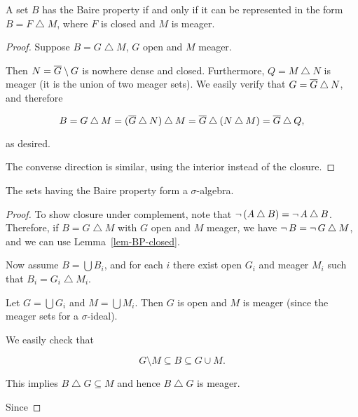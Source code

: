 \begin{lemma}\label{lem-bp-closed}A set $B$ has the Baire property if and only if it can be represented in the form $B = F \bigtriangleup M$,  where $F$ is closed and $M$ is meager.

\end{lemma}\begin{proof}Suppose $B = G \bigtriangleup M$, $G$ open and $M$ meager.

Then $N = \overline{G} \setminus G$ is nowhere dense and closed. Furthermore, $Q = M \bigtriangleup N$ is meager (it is the union of two meager sets). We easily verify that $G = \overline{G} \bigtriangleup N$, and therefore

\begin{equation}
B = G \bigtriangleup M = (\overline{G} \bigtriangleup N) \bigtriangleup M = \overline{G} \bigtriangleup (N \bigtriangleup M) = \overline{G} \bigtriangleup Q,
\end{equation}

as desired.

The converse direction is similar, using the interior instead of the closure.

\end{proof}\begin{proposition}\label{prop-bp-sigma-algebra}The sets having the Baire property form a $\sigma$-algebra.

\end{proposition}\begin{proof}To show closure under complement, note that $\neg \, (A \bigtriangleup B) = \neg \, A \bigtriangleup B$. Therefore,
if $B = G \bigtriangleup M$ with $G$ open and $M$ meager, we have $\neg \, B = \neg \, G \bigtriangleup M$, and we can use Lemma~\ref{lem-BP-closed}.

Now assume $B = \bigcup B_i$, and for each $i$ there exist open $G_i$ and meager $M_i$ such that $B_i = G_i \bigtriangleup M_i$.

Let $G = \bigcup G_i$ and $M = \bigcup M_i$. Then $G$ is open and $M$ is meager (since the meager sets for a $\sigma$-ideal).

We easily check that

\begin{equation}
G \setminus M  \subseteq B \subseteq G \cup M.
\end{equation}

This implies $B \bigtriangleup G \subseteq M$ and hence $B \bigtriangleup G$ is meager.

Since


\end{proof}

